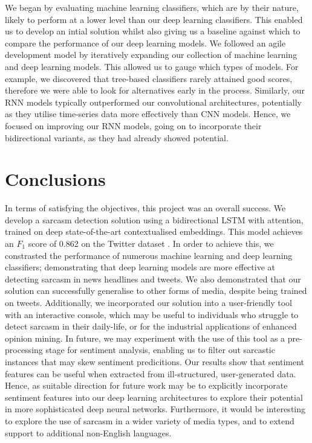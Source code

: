 \documentclass[12pt,a4paper]{article}
\begin{document}
\noindent We began by evaluating machine learning classifiers, which are by their nature, likely to perform at a lower level than our deep learning classifiers. This enabled us to develop an intial solution whilst also giving us a baseline against which to compare the performance of our deep learning models. We followed an agile development model by iteratively expanding our collection of machine learning and deep learning models. This allowed us to gauge which types of models. For example, we discovered that tree-based classifiers rarely attained good scores, therefore we were able to look for alternatives early in the process. Similarly, our RNN models typically outperformed our convolutional architectures, potentially as they utilise time-series data more effectively than CNN models. Hence, we focused on improving our RNN models, going on to incorporate their bidirectional variants, as they had already showed potential.


\section{Conclusions}\vspace{-4.2pt}
\noindent In terms of satisfying the objectives, this project was an overall success. We develop a sarcasm detection solution using a bidirectional LSTM with attention, trained on deep state-of-the-art contextualised embeddings. This model achieves an $F_1$ score of 0.862 on the Twitter dataset \cite{ptavcek2014sarcasm}. In order to achieve this, we constrasted the performance of numerous machine learning and deep learning classifiers; demonstrating that deep learning models are more effective at detecting sarcasm in news headlines and tweets. We also demonstrated that our solution can successfully generalise to other forms of media, despite being trained on tweets. Additionally, we incorporated our solution into a user-friendly tool with an interactive console, which may be useful to individuals who struggle to detect sarcasm in their daily-life, or for the industrial applications of enhanced opinion mining. In future, we may experiment with the use of this tool as a pre-processing stage for sentiment analysis, enabling us to filter out sarcastic instances that may skew sentiment predicitions. Our results show that sentiment features can be useful when extracted from ill-structured, user-generated data. Hence, as suitable direction for future work may be to explicitly incorporate sentiment features into our deep learning architectures to explore their potential in more sophisticated deep neural networks. Furthermore, it would be interesting to explore the use of sarcasm in a wider variety of media types, and to extend support to additional non-English languages. 
\end{document}
